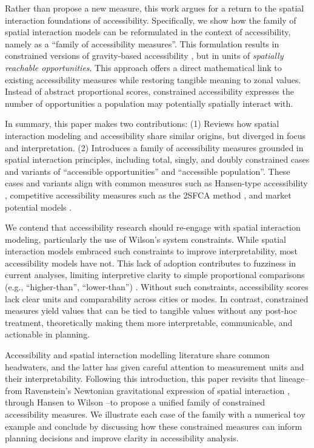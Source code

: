 \documentclass[
  10pt,
  letterpaper,
]{article}
\begin{document}
Rather than propose a new measure, this work argues for a return to the
spatial interaction foundations of accessibility. Specifically, we show
how the family of spatial interaction models \citep{wilson1971} can be
reformulated in the context of accessibility, namely as a ``family of
accessibility measures''. This formulation results in constrained
versions of gravity-based accessibility \citep[e.g.,][]{hansen1959}, but
in units of \emph{spatially reachable opportunities}. This approach
offers a direct mathematical link to existing accessibility measures
while restoring tangible meaning to zonal values. Instead of abstract
proportional scores, constrained accessibility expresses the number of
opportunities a population may potentially spatially interact with.

In summary, this paper makes two contributions: (1) Reviews how spatial
interaction modeling and accessibility share similar origins, but
diverged in focus and interpretation. (2) Introduces a family of
accessibility measures grounded in spatial interaction principles,
including total, singly, and doubly constrained cases and variants of
``accessible opportunities'' and ``accessible population''. These cases
and variants align with common measures such as Hansen-type
accessibility \citep{hansen1959}, competitive accessibility measures
such as the 2SFCA method \citep{shen1998, luo2003}, and market potential
models
\citep{harris_market_1954, vickermanAccessibilityAttractionPotential1974}.

We contend that accessibility research should re-engage with spatial
interaction modeling, particularly the use of Wilson's system
constraints. While spatial interaction models embraced such constraints
to improve interpretability, most accessibility models have not. This
lack of adoption contributes to fuzziness in current analyses, limiting
interpretive clarity to simple proportional comparisons (e.g.,
``higher-than'', ``lower-than'')
\citep{millerAccessibilityMeasurementApplication2018}. Without such
constraints, accessibility scores lack clear units and comparability
across cities or modes. In contrast, constrained measures yield values
that can be tied to tangible values without any post-hoc treatment,
theoretically making them more interpretable, communicable, and
actionable in planning.

Accessibility and spatial interaction modelling literature share common
headwaters, and the latter has given careful attention to measurement
units and their interpretability. Following this introduction, this
paper revisits that lineage--from Ravenstein's Newtonian gravitational
expression of spatial interaction \citep{ravensteinLawsMigration1889},
through Hansen \citep{hansen1959} to Wilson \citep{wilson1971}--to
propose a unified family of constrained accessibility measures. We
illustrate each case of the family with a numerical toy example and
conclude by discussing how these constrained measures can inform
planning decisions and improve clarity in accessibility analysis.
\end{document}
